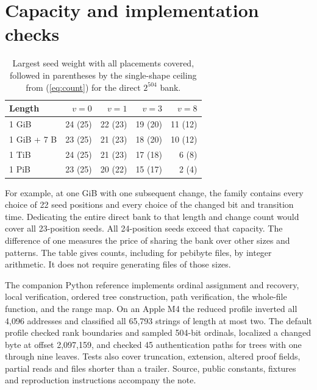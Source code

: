 \documentclass[10pt,twocolumn,letterpaper]{article}
\begin{document}
\section{Capacity and implementation checks}
\begin{table}[ht]
\centering\small
\caption{Largest seed weight with all placements covered, followed in parentheses by the single-shape ceiling from (\ref{eq:count}) for the direct \(2^{504}\) bank.}
\begin{tabular}{@{}lrrrr@{}}
\toprule
Length & \(v=0\)&\(v=1\)&\(v=3\)&\(v=8\)\\
\midrule
1 GiB & 24 (25)&22 (23)&19 (20)&11 (12)\\
1 GiB + 7 B & 23 (25)&21 (23)&18 (20)&10 (12)\\
1 TiB & 24 (25)&21 (23)&17 (18)&6 (8)\\
1 PiB & 23 (25)&20 (22)&15 (17)&2 (4)\\
\bottomrule
\end{tabular}
\end{table}
For example, at one GiB with one subsequent change, the family contains every choice of 22 seed positions and every choice of the changed bit and transition time. Dedicating the entire direct bank to that length and change count would cover all 23-position seeds. All 24-position seeds exceed that capacity. The difference of one measures the price of sharing the bank over other sizes and patterns. The table gives counts, including for pebibyte files, by integer arithmetic. It does not require generating files of those sizes.

The companion Python reference implements ordinal assignment and recovery, local verification, ordered tree construction, path verification, the whole-file function, and the range map. On an Apple M4 the reduced profile inverted all 4,096 addresses and classified all 65,793 strings of length at most two. The default profile checked rank boundaries and sampled 504-bit ordinals, localized a changed byte at offset 2,097,159, and checked 45 authentication paths for trees with one through nine leaves. Tests also cover truncation, extension, altered proof fields, partial reads and files shorter than a trailer. Source, public constants, fixtures and reproduction instructions accompany the note.
\end{document}
